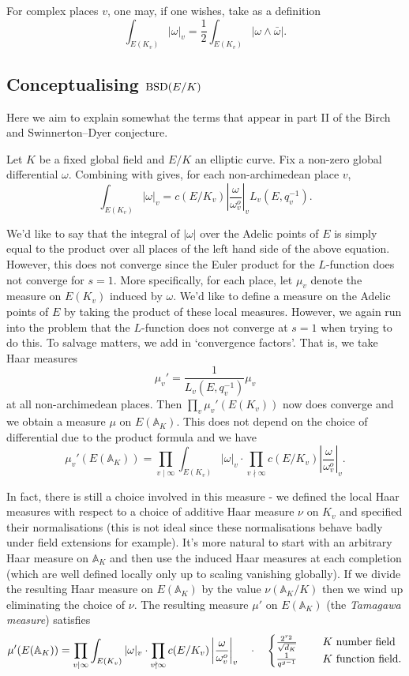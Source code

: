 \documentclass[12pt]{amsart}
\numberwithin{equation}{section}
\theoremstyle{remark}
\theoremstyle{definition}
\theoremstyle{definition}
\theoremstyle{definition}
\theoremstyle{definition}
\theoremstyle{definition}
\theoremstyle{definition}
\theoremstyle{definition}
\begin{document}
 For complex places $v$, one may, if one wishes, take as a definition
 \[\int_{E(K_v)}|\omega|_v=\frac{1}{2}\int_{E(K_v)}|\omega \wedge \bar{\omega}|.\]

 
 \subsection{Conceptualising $\textup{BSD}(E/K)$}
 
 Here we aim to explain somewhat the terms that appear in part II of the Birch and Swinnerton--Dyer conjecture. 
 
 Let $K$ be a fixed global field and $E/K$ an elliptic curve. Fix a non-zero global differential $\omega$. Combining  with  gives, for each non-archimedean place $v$, 
 \begin{equation}
 \int_{E(K_v)}|\omega|_v=c(E/K_v)\left|\frac{\omega}{\omega_{v}^o}\right|_v L_v(E,q_v^{-1}).
 \end{equation}
 
 We'd like to say that the integral of $|\omega|$ over the Adelic points of $E$ is simply equal to the product over all places of the left hand side of the above equation. However, this does not converge since the Euler product for the $L$-function does not converge for $s=1$. More specifically, for each place, let $\mu_v$ denote the measure on $E(K_v)$ induced by $\omega$. We'd like to define a measure on the Adelic points of $E$ by taking the product of these local measures. However, we again run into the problem that the $L$-function does not converge at $s=1$ when trying to do this. To salvage matters, we add in `convergence factors'. That is, we take Haar measures 
 \[\mu_v'=\frac{1}{L_v(E,q_v^{-1})}\mu_v\]
 at all non-archimedean places. Then $\prod_v\mu_v'(E(K_v))$ now does converge and we obtain a measure $\mu$ on $E(\mathbb{A}_K)$. This does not depend on the choice of differential due to the product formula and we have
 \[\mu_v'(E(\mathbb{A}_K))=\prod_{v\mid \infty}\int_{E(K_v)}|\omega|_v\cdot \prod_{v \nmid \infty}c(E/K_v) \left|\frac{\omega}{\omega_{v}^o}\right|_v.\]  
 
 In fact, there is still a choice involved in this measure - we defined the local Haar measures with respect to a choice of additive Haar measure $\nu$ on $K_v$ and specified their normalisations (this is not ideal since these normalisations behave badly under field extensions for example). It's more natural to start with an arbitrary Haar measure on $\mathbb{A}_K$ and then use the induced Haar measures at each completion (which are well defined locally only up to scaling vanishing globally). If we divide the resulting Haar measure on $E(\mathbb{A}_K)$ by the value $\nu(\mathbb{A}_K/K)$ then we wind up eliminating the choice of $\nu$. The resulting measure $\mu'$ on $E(\mathbb{A}_K)$ (the \textit{Tamagawa measure}) satisfies
 \[\mu'(E(\mathbb{A}_K))=\prod_{v\mid \infty}\int_{E(K_v)}|\omega|_v\cdot \prod_{v \nmid \infty}c(E/K_v) \left|\frac{\omega}{\omega_{v}^o}\right|_v~~~\cdot ~~~\begin{cases}\frac{2^{r_2}}{\sqrt{d_K}}~~&~~K~\textup{number field}\\ \frac{1}{q^{g-1}}~~&~~K\textup{ function field.}\end{cases}\]
 
\end{document}
